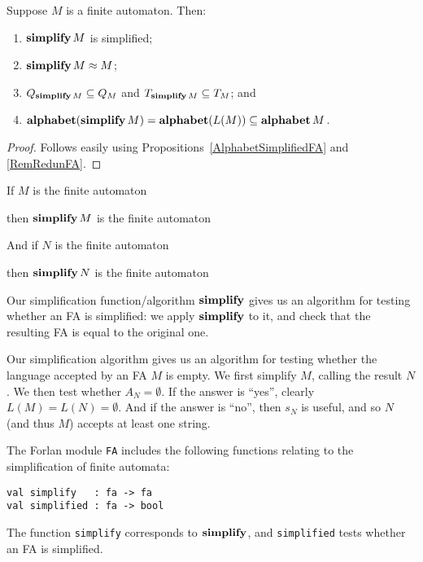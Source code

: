 \begin{proposition}
Suppose $M$ is a finite automaton.
Then:
\begin{enumerate}[\quad(1)]
\item $\mathbf{simplify}\,M$ is simplified;

\item $\mathbf{simplify}\,M\approx M$;

\item $Q_{\mathbf{simplify}\,M}\subseteq Q_M$ and $T_{\mathbf{simplify}\,M}\subseteq T_M$; and

\item $\mathbf{alphabet}(\mathbf{simplify}\,M) = \mathbf{alphabet}(L(M)) \subseteq\mathbf{alphabet}\,M$.
\end{enumerate}
\end{proposition}

\begin{proof}
Follows easily using Propositions~\ref{AlphabetSimplifiedFA} and
\ref{RemRedunFA}.
\end{proof}

If $M$ is the finite automaton
\begin{center}

\end{center}
then $\mathbf{simplify}\,M$ is the finite automaton
\begin{center}

\end{center}
And if $N$ is the finite automaton
\begin{center}

\end{center}
then $\mathbf{simplify}\,N$ is the finite automaton
\begin{center}

\end{center}

Our simplification function/algorithm $\mathbf{simplify}$ gives us an
algorithm for testing whether an FA is simplified: we apply
$\mathbf{simplify}$ to it, and check that the resulting FA is equal to
the original one.

Our simplification algorithm gives us an algorithm for testing whether
the language accepted by an FA $M$ is empty. We first simplify $M$,
calling the result $N$. We then test whether $A_N=\emptyset$.  If
the answer is ``yes'', clearly $L(M)=L(N)=\emptyset$. And if the
answer is ``no'', then $s_N$ is useful, and so $N$ (and thus $M$) accepts
at least one string.

The Forlan module \texttt{FA}
%
includes the following functions relating to the simplification of
finite automata:
\begin{verbatim}
val simplify   : fa -> fa
val simplified : fa -> bool
\end{verbatim}
%
%
The function \texttt{simplify} corresponds to $\mathbf{simplify}$, and
\texttt{simplified} tests whether an FA is simplified.

